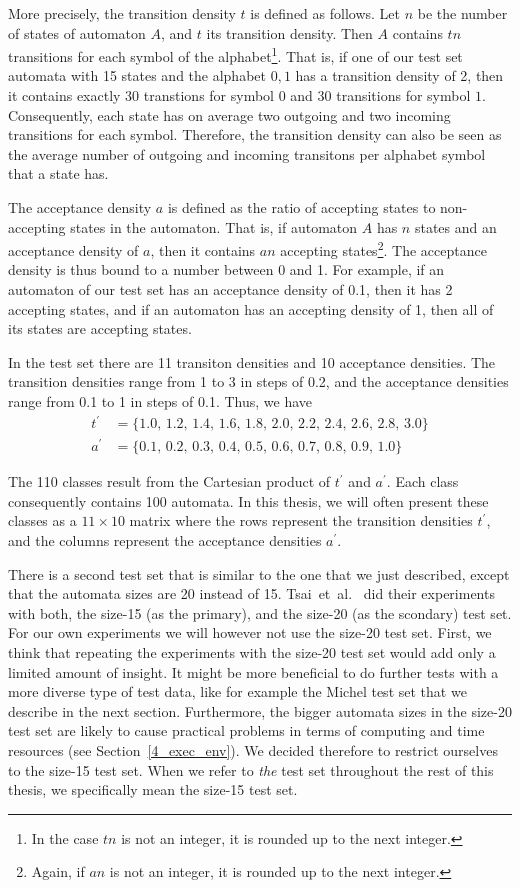 More precisely, the transition density $t$ is defined as follows. Let $n$ be the number of states of automaton $A$, and $t$ its transition density. Then $A$ contains $tn$ transitions for each symbol of the alphabet\footnote{In the case $tn$ is not an integer, it is rounded up to the next integer.}. That is, if one of our test set automata with 15 states and the alphabet ${0, 1}$ has a transition density of 2, then it contains exactly 30 transtions for symbol $0$ and 30 transitions for symbol $1$. Consequently, each state has on average two outgoing and two incoming transitions for each symbol. Therefore, the transition density can also be seen as the average number of outgoing and incoming transitons per alphabet symbol that a state has.

The acceptance density $a$ is defined as the ratio of accepting states to non-accepting states in the automaton. That is, if automaton $A$ has $n$ states and an acceptance density of $a$, then it contains $an$ accepting states\footnote{Again, if $an$ is not an integer, it is rounded up to the next integer.}. The acceptance density is thus bound to a number between 0 and 1. For example, if an automaton of our test set has an acceptance density of 0.1, then it has 2 accepting states, and if an automaton has an accepting density of 1, then all of its states are accepting states.

In the \goal{} test set there are 11 transiton densities and 10 acceptance densities. The transition densities range from 1 to 3 in steps of 0.2, and the acceptance densities range from 0.1 to 1 in steps of 0.1. Thus, we have
\begin{align*}
t^\prime& = \{ 1.0,\,1.2,\,1.4,\,1.6,\,1.8,\,2.0,\,2.2,\,2.4,\,2.6,\,2.8,\,3.0 \} \\
a^\prime & = \{ 0.1,\,0.2,\,0.3,\,0.4,\,0.5,\,0.6,\,0.7,\,0.8,\,0.9,\,1.0 \}
\end{align*}

The 110 classes result from the Cartesian product of $t^\prime$ and $a^\prime$. Each class consequently contains 100 automata. In this thesis, we will often present these classes as a $11 \times 10$ matrix where the rows represent the transition densities $t^\prime$, and the columns represent the acceptance densities $a^\prime$.

There is a second \goal{} test set that is similar to the one that we just described, except that the automata sizes are 20 instead of 15. Tsai~et~al.~\cite{2010_tsai} did their experiments with both, the size-15 (as the primary), and the size-20 (as the scondary) test set. For our own experiments we will however not use the size-20 test set. First, we think that repeating the experiments with the size-20 test set would add only a limited amount of insight. It might be more beneficial to do further tests with a more diverse type of test data, like for example the Michel test set that we describe in the next section. Furthermore, the bigger automata sizes in the size-20 test set are likely to cause practical problems in terms of computing and time resources (see Section~\ref{4_exec_env}). We decided therefore to restrict ourselves to the size-15 test set. When we refer to \textit{the} \goal{} test set throughout the rest of this thesis, we specifically mean the size-15 test set.

